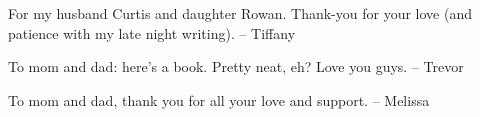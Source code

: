 
\thispagestyle{empty}

\begin{center}
For my husband Curtis and daughter Rowan. Thank-you for your love 
\linebreak(and patience with my late night writing).
\linebreak-- Tiffany

To mom and dad: here's a book. Pretty neat, eh? Love you guys.
\linebreak-- Trevor

To mom and dad, thank you for all your love and support.
\linebreak-- Melissa
\end{center}

\setlength{\abovedisplayskip}{-5pt}
\setlength{\abovedisplayshortskip}{-5pt}

